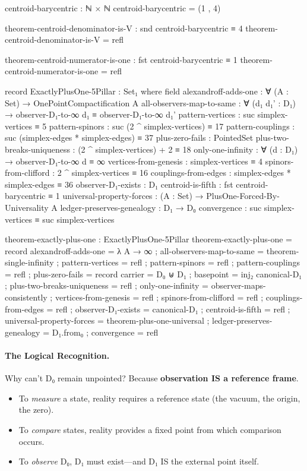 \documentclass[11pt,a4paper]{book}
\begin{document}
\begin{code}
centroid-barycentric : ℕ × ℕ
centroid-barycentric = (1 , 4)

theorem-centroid-denominator-is-V : snd centroid-barycentric ≡ 4
theorem-centroid-denominator-is-V = refl

theorem-centroid-numerator-is-one : fst centroid-barycentric ≡ 1
theorem-centroid-numerator-is-one = refl

record ExactlyPlusOne-5Pillar : Set₁ where
  field
    alexandroff-adds-one : ∀ (A : Set) → OnePointCompactification A
    all-observers-map-to-same : ∀ (d₁ d₁' : D₁) → 
      observer-D₁-to-∞ d₁ ≡ observer-D₁-to-∞ d₁'
    pattern-vertices : suc simplex-vertices ≡ 5
    pattern-spinors : suc (2 ^ simplex-vertices) ≡ 17
    pattern-couplings : suc (simplex-edges * simplex-edges) ≡ 37
    plus-zero-fails : PointedSet
    plus-two-breaks-uniqueness : (2 ^ simplex-vertices) + 2 ≡ 18
    only-one-infinity : ∀ (d : D₁) → observer-D₁-to-∞ d ≡ ∞
    vertices-from-genesis : simplex-vertices ≡ 4
    spinors-from-clifford : 2 ^ simplex-vertices ≡ 16
    couplings-from-edges : simplex-edges * simplex-edges ≡ 36
    observer-D₁-exists : D₁
    centroid-is-fifth : fst centroid-barycentric ≡ 1
    universal-property-forces : (A : Set) → PlusOne-Forced-By-Universality A
    ledger-preserves-genealogy : D₁ → D₀
    convergence : suc simplex-vertices ≡ suc simplex-vertices

theorem-exactly-plus-one : ExactlyPlusOne-5Pillar
theorem-exactly-plus-one = record
  { alexandroff-adds-one = λ A → ∞
  ; all-observers-map-to-same = theorem-single-infinity
  ; pattern-vertices = refl
  ; pattern-spinors = refl
  ; pattern-couplings = refl
  ; plus-zero-fails = record { carrier = D₀ ⊎ D₁ ; basepoint = inj₂ canonical-D₁ }
  ; plus-two-breaks-uniqueness = refl
  ; only-one-infinity = observer-maps-consistently
   ; vertices-from-genesis = refl
  ; spinors-from-clifford = refl
  ; couplings-from-edges = refl
  ; observer-D₁-exists = canonical-D₁
  ; centroid-is-fifth = refl
  ; universal-property-forces = theorem-plus-one-universal
  ; ledger-preserves-genealogy = D₁.from₀
  ; convergence = refl
  }
\end{code}

\paragraph{The Logical Recognition.}
Why can't D₀ remain unpointed? Because \textbf{observation IS a reference frame}.
\begin{itemize}
\item To \emph{measure} a state, reality requires a reference state (the vacuum, the origin, the zero).
\item To \emph{compare} states, reality provides a fixed point from which comparison occurs.
\item To \emph{observe} D₀, D₁ must exist—and D₁ IS the external point itself.
\end{itemize}
\end{document}
